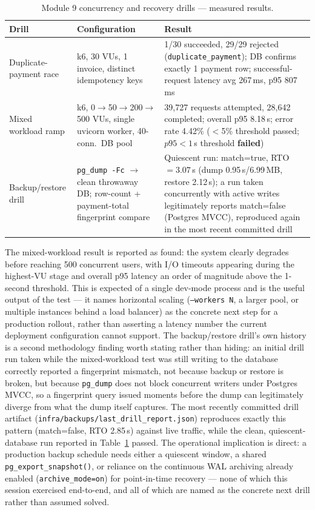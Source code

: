 \begin{table}[t]
  \centering
  \scriptsize
  \caption{Module 9 concurrency and recovery drills — measured results.}
  \label{tab:reliability}
  \begin{tabular}{p{}p{}p{}}
    \toprule
    Drill & Configuration & Result \\
    \midrule
    Duplicate-payment race & k6, 30 VUs, 1 invoice, distinct idempotency keys & 1/30 succeeded, 29/29 rejected (\texttt{duplicate\_payment}); DB confirms exactly 1 payment row; successful-request latency avg 267\,ms, p95 807\,ms \\
    \addlinespace
    Mixed workload ramp & k6, 0$\to$50$\to$200$\to$500 VUs, single uvicorn worker, 40-conn.\ DB pool & 39{,}727 requests attempted, 28{,}642 completed; overall p95 8.18\,s; error rate 4.42\% ($<$5\% threshold passed; $p95<1$\,s threshold \textbf{failed}) \\
    \addlinespace
    Backup/restore drill & \texttt{pg\_dump -Fc} $\to$ clean throwaway DB; row-count + payment-total fingerprint compare & Quiescent run: match=true, RTO$=3.07$\,s (dump 0.95\,s/6.99\,MB, restore 2.12\,s); a run taken concurrently with active writes legitimately reports match=false (Postgres MVCC), reproduced again in the most recent committed drill \\
    \bottomrule
  \end{tabular}
\end{table}

The mixed-workload result is reported as found: the system clearly degrades before reaching 500 concurrent users, with I/O timeouts appearing during the highest-VU stage and overall p95 latency an order of magnitude above the 1-second threshold. This is expected of a single dev-mode process and is the useful output of the test — it names horizontal scaling (\texttt{--workers~N}, a larger pool, or multiple instances behind a load balancer) as the concrete next step for a production rollout, rather than asserting a latency number the current deployment configuration cannot support. The backup/restore drill's own history is a second methodology finding worth stating rather than hiding: an initial drill run taken while the mixed-workload test was still writing to the database correctly reported a fingerprint mismatch, not because backup or restore is broken, but because \texttt{pg\_dump} does not block concurrent writers under Postgres MVCC, so a fingerprint query issued moments before the dump can legitimately diverge from what the dump itself captures. The most recently committed drill artifact (\texttt{infra/backups/last\_drill\_report.json}) reproduces exactly this pattern (match=false, RTO 2.85\,s) against live traffic, while the clean, quiescent-database run reported in Table~\ref{tab:reliability} passed. The operational implication is direct: a production backup schedule needs either a quiescent window, a shared \texttt{pg\_export\_snapshot()}, or reliance on the continuous WAL archiving already enabled (\texttt{archive\_mode=on}) for point-in-time recovery — none of which this session exercised end-to-end, and all of which are named as the concrete next drill rather than assumed solved.

